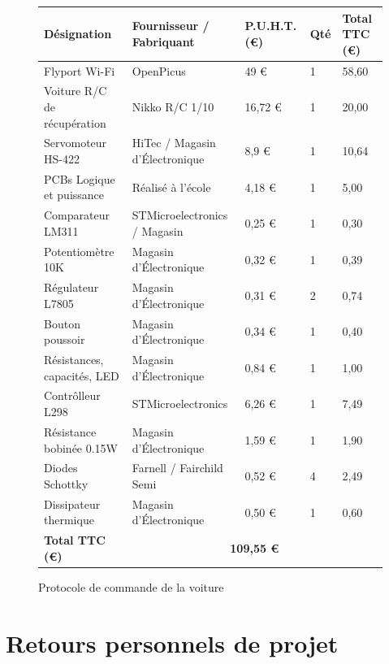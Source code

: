 \documentclass[a4paper,12pt]{report}
\begin{document}
\begin{figure}[!h]
	\scriptsize
	\begin{center}
		\begin{tabular}{|l|l|l|l|l|}
		\hline
		\texttt{} \scriptsize\bf{Désignation} & \scriptsize\bf{Fournisseur / Fabriquant} & \scriptsize\bf{P.U.H.T. (\euro)} & \scriptsize\bf{Qté} & \scriptsize\bf{Total TTC (\euro)} \\ \hline
			\texttt{} Flyport Wi-Fi & OpenPicus & 49 \euro & 1 & 58,60 \\ \hline
			\texttt{} Voiture R/C de récupération & Nikko R/C 1/10\ieme & 16,72 \euro & 1 & 20,00 \\ \hline
			\texttt{} Servomoteur HS-422 & HiTec / Magasin d’Électronique & 8,9 \euro & 1 & 10,64 \\ \hline
			\texttt{} PCBs Logique et puissance & Réalisé à l’école & 4,18 \euro & 1 & 5,00 \\ \hline
			\texttt{} Comparateur LM311 & STMicroelectronics / Magasin & 0,25 \euro & 1 & 0,30 \\ \hline
			\texttt{} Potentiomètre 10K\ohm & Magasin d’Électronique & 0,32 \euro & 1 & 0,39 \\ \hline
			\texttt{} Régulateur L7805 & Magasin d’Électronique & 0,31 \euro & 2 & 0,74 \\ \hline
			\texttt{} Bouton poussoir & Magasin d’Électronique & 0,34 \euro & 1 & 0,40 \\ \hline
			\texttt{} Résistances, capacités, LED & Magasin d’Électronique & 0,84 \euro & 1 & 1,00 \\ \hline
			\texttt{} Contrôlleur L298 & STMicroelectronics & 6,26 \euro & 1 & 7,49 \\ \hline
			\texttt{} Résistance bobinée 0.1\ohm 5W & Magasin d’Électronique & 1,59 \euro & 1 & 1,90 \\ \hline
			\texttt{} Diodes Schottky & Farnell / Fairchild Semi & 0,52 \euro & 4 & 2,49 \\ \hline
			\texttt{} Dissipateur thermique & Magasin d’Électronique & 0,50 \euro & 1 & 0,60 \\ \hline
		 \scriptsize\bf{Total TTC (\euro)} & \multicolumn{4}{c|}{ \scriptsize\bf{109,55 \euro}} \\ \hline
	\end{tabular}
	\end{center}
	\caption{Protocole de commande de la voiture} 
	\label{tableaumateriel}
\end{figure}
	
	\section{Retours personnels de projet}
	
\end{document}

